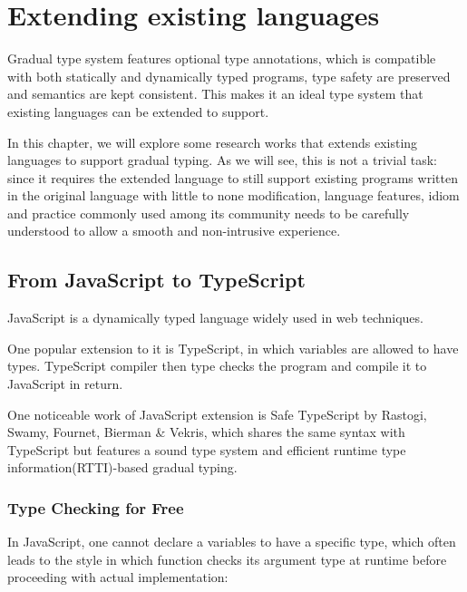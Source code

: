 
\renewcommand{\thechapter}{2}

\chapter{Extending existing languages}

Gradual type system features optional type annotations,
which is compatible with both statically and dynamically typed programs,
type safety are preserved and semantics are kept consistent.
This makes it an ideal type system that
existing languages can be extended to support.

In this chapter, we will explore some research works that extends existing languages
to support gradual typing. As we will see, this is not a trivial task:
since it requires the extended language to still support existing programs written
in the original language with little to none modification,
language features, idiom and practice commonly used among its community
needs to be carefully understood to allow a smooth and non-intrusive experience.

\section{From JavaScript to TypeScript}

JavaScript is a dynamically typed language widely used in web techniques.


One popular extension to it is TypeScript, in which variables are allowed to
have types. TypeScript compiler then type checks the program and compile it to JavaScript
in return.

One noticeable work of JavaScript extension is Safe TypeScript by Rastogi, Swamy, Fournet, Bierman \& Vekris, which shares the same syntax with TypeScript
but features a sound type system and efficient runtime type information(RTTI)-based
gradual typing.

\subsection{Type Checking for Free}

In JavaScript, one cannot declare a variables to have a specific type,
which often leads to the style in which function checks its argument type at runtime
before proceeding with actual implementation:

